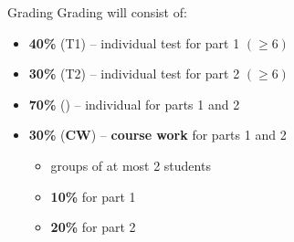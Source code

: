 \documentclass[aspectratio=169]{beamer}
\begin{document}
\begin{frame}{Grading}
  Grading will consist of:
  \begin{itemize}
  \item \textbf{40\%} (\alert{T1}) -- individual \alert{test} for part 1 $(\geq 6)$
  \item \textbf{30\%} (\alert{T2}) -- individual \alert{test} for part 2 $(\geq 6)$
  \item \textbf{70\%} () -- individual  for parts 1 and 2
  \item \textbf{30\%} (\textbf{CW}) -- \textbf{course work} for parts 1 and 2
    \begin{itemize}
      \item groups of at most 2 students
      \item \textbf{10\%} for part 1
      \item \textbf{20\%} for part 2
    \end{itemize}
  \end{itemize}

\end{frame}

\end{document}
